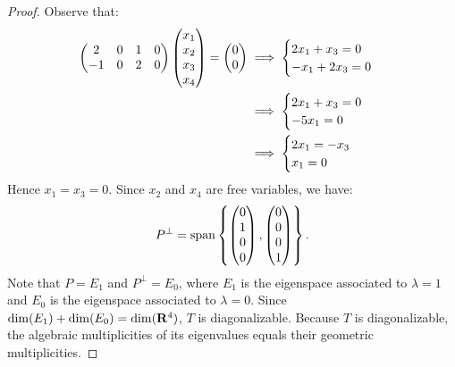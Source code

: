 \documentclass[10pt,twoside,openany]{memoir}
\begin{document}
{\begin{proof}
        Observe that:
            \begin{equation*}
            \begin{split}
                \left( \begin{matrix} 2 & 0 & 1 & 0 \\ -1 & 0 & 2 & 0 \end{matrix} \right) \left( \begin{matrix} x_1 \\ x_2 \\ x_3 \\ x_4 \end{matrix} \right) = \left( \begin{matrix} 0\\0\end{matrix} \right) 
                & \implies \begin{cases}
                    2x_1 + x_3 = 0 \\
                    -x_1 + 2x_3 = 0 
                \end{cases} \\
                & \implies \begin{cases}
                    2x_1 + x_3 = 0 \\
                    -5x_1 = 0 
                \end{cases} \\
                & \implies \begin{cases}
                    2x_1 = -x_3 \\
                    x_1 = 0 
                \end{cases} \\
            \end{split}
            \end{equation*}
        Hence $x_1 = x_3 = 0$. Since $x_2$ and $x_4$ are free variables, we have:
            \begin{equation*}
            \begin{split}
                P^\perp = \operatorname{span} \left\{\left( \begin{matrix} 0 \\ 1 \\ 0 \\ 0 \end{matrix} \right),\left( \begin{matrix} 0 \\ 0 \\ 0 \\ 1 \end{matrix} \right) \right\}.
            \end{split}
            \end{equation*}
        Note that $P = E_1$ and $P^\perp = E_0$, where $E_1$ is the eigenspace associated to $\lambda = 1$ and $E_0$ is the eigenspace associated to $\lambda = 0$. Since $\dim(E_1) + \dim(E_0) = \dim (\mathbf{R}^4)$, $T$ is diagonalizable. Because $T$ is diagonalizable, the algebraic multiplicities of its eigenvalues equals their geometric multiplicities.


\end{proof}}
\end{document}
